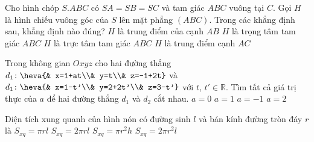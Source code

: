 \begin{ex}%
Cho hình chóp $S.ABC$ có $SA=SB=SC$ và tam giác $ABC$ vuông tại $C$. Gọi $H$ là hình chiếu vuông góc của $S$ lên mặt phẳng $(ABC)$. Trong các khẳng định sau, khẳng định nào đúng?
\choice
{\True $H$ là trung điểm của cạnh $AB$}
{$H$ là trọng tâm tam giác $ABC$}
{$H$ là trực tâm tam giác $ABC$}
{$H$ là trung điểm cạnh $AC$}
\end{ex}

\begin{ex}%
Trong không gian $Oxyz$ cho hai đường thẳng $d_1\colon\heva{& x=1+at\\& y=t\\& z=-1+2t}$ và $d_1\colon\heva{& x=1-t'\\& y=2+2t'\\& z=3-t'}$ với $t$, $t'\in\mathbb{R}$. Tìm tất cả giá trị thực của $a$ để hai đường thẳng $d_1$ và $d_2$ cắt nhau.
\choice
{\True $a=0$}
{$a=1$}
{$a=-1$}
{$a=2$}
\end{ex}

\begin{ex}%
Diện tích xung quanh của hình nón có đường sinh $l$ và bán kính đường tròn đáy $r$ là
\choice
{\True $S_{xq}=\pi rl$}
{$S_{xq}=2\pi rl$}
{$S_{xq}=\pi r^2h$}
{$S_{xq}=2\pi r^2l$}
\end{ex}

